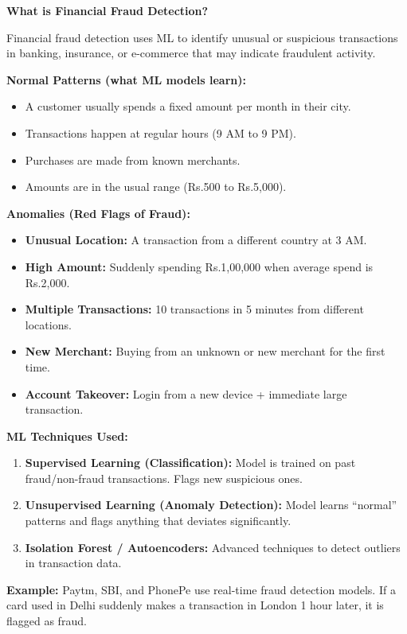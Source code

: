 \documentclass[12pt,a4paper]{article}
\newcommand{\term}[1]{\textbf{\color{headingcolor}#1}}
\newcommand{\rupee}{\textrm{Rs.}}
\begin{document}
\begin{answerenv}

\textbf{\color{headingcolor}What is Financial Fraud Detection?}

Financial fraud detection uses ML to identify unusual or suspicious transactions in banking, insurance, or e-commerce that may indicate fraudulent activity.

\vspace{6pt}
\textbf{\color{headingcolor}Normal Patterns (what ML models learn):}
\begin{itemize}[leftmargin=1.5em, itemsep=3pt]
  \item A customer usually spends a fixed amount per month in their city.
  \item Transactions happen at regular hours (9 AM to 9 PM).
  \item Purchases are made from known merchants.
  \item Amounts are in the usual range (\textrm{\rupee}500 to \textrm{\rupee}5,000).
\end{itemize}

\textbf{\color{headingcolor}Anomalies (Red Flags of Fraud):}
\begin{itemize}[leftmargin=1.5em, itemsep=3pt]
  \item \term{Unusual Location:} A transaction from a different country at 3 AM.
  \item \term{High Amount:} Suddenly spending \textrm{\rupee}1,00,000 when average spend is \textrm{\rupee}2,000.
  \item \term{Multiple Transactions:} 10 transactions in 5 minutes from different locations.
  \item \term{New Merchant:} Buying from an unknown or new merchant for the first time.
  \item \term{Account Takeover:} Login from a new device + immediate large transaction.
\end{itemize}

\textbf{\color{headingcolor}ML Techniques Used:}
\begin{enumerate}[leftmargin=1.8em, itemsep=3pt]
  \item \term{Supervised Learning (Classification):} Model is trained on past fraud/non-fraud transactions. Flags new suspicious ones.
  \item \term{Unsupervised Learning (Anomaly Detection):} Model learns ``normal'' patterns and flags anything that deviates significantly.
  \item \term{Isolation Forest / Autoencoders:} Advanced techniques to detect outliers in transaction data.
\end{enumerate}

\begin{keypoint}
\textbf{Example:} Paytm, SBI, and PhonePe use real-time fraud detection models. If a card used in Delhi suddenly makes a transaction in London 1 hour later, it is flagged as fraud.
\end{keypoint}

\end{answerenv}
\end{document}
